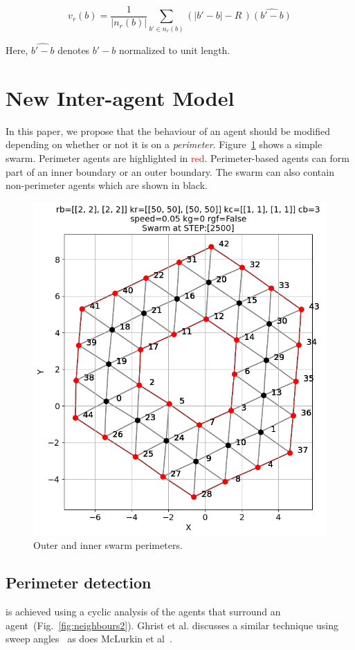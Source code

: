 \documentclass[12pt,a4paper]{IEEEtran}
\newcommand{\card}[1]{\vert{#1}\vert}
\newcommand{\vbb}[2]{#2-#1}
\begin{document}
\begin{equation}\label{eq:repulsion2a}
v_r(b) = \frac{1}{\card{n_r(b)}}\sum_{b' \in n_r(b)} \left(\card{\vbb{b}{b'}} - R \, \right)\widehat{\left(\vbb{b}{b'}\right)}
\end{equation}

Here, $\widehat{\vbb{b}{b'}}$ denotes $\vbb{b}{b'}$ normalized to unit length.

\section{New Inter-agent Model}
In this paper, we propose that the behaviour of an agent should be modified depending on whether or not it is on a \emph{perimeter}. Figure~\ref{fig:simplePerim2} shows a simple swarm. Perimeter agents are highlighted in \textcolor{red}{red}. Perimeter-based agents can form part of an inner boundary or an outer boundary. The swarm can also contain non-perimeter agents which are shown in black.

\begin{figure}[H]
	\begin{center}
		\includegraphics[width=0.8\linewidth]{figures/relationships2}
	\end{center}
	\caption{Outer and inner swarm perimeters. \label{fig:simplePerim2}}
\end{figure}

\subsection{Perimeter detection}\label{sec:perimeterDetection} is achieved using a cyclic analysis of the agents that surround an agent~(Fig.~\ref{fig:neighbours2}). Ghrist et al. discusses a similar technique using sweep angles~\cite{ghrist2008surrounding} as does McLurkin et al~\cite{mclurkin2009}. 
\end{document}
